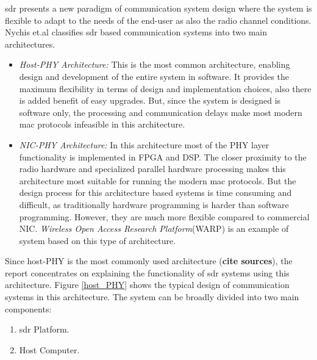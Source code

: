 \ac{sdr} presents a new paradigm of communication system design where the system is flexible to adapt to the needs of the end-user as also the radio channel conditions. Nychis et.al \cite{nychis_enabling_nodate} classifies \ac{sdr} based communication systems into two main architectures.
\begin{itemize} 
\item{\textit{Host-PHY Architecture:} This is the most common architecture, enabling design and development of the entire system in software.
It provides the maximum flexibility in terms of design and implementation choices, also there is added benefit of easy upgrades.
But, since the system is designed is software only, the processing and communication delays make most modern \ac{mac} protocols infeasible in this architecture.}


\item{\textit{NIC-PHY Architecture:} In this architecture most of the \ac{PHY} layer functionality is implemented in \ac{FPGA} and \ac{DSP}.
The closer proximity to the radio hardware and specialized parallel hardware processing makes this architecture most suitable for running the modern \ac{mac} protocols.
But the design process for this architecture based systems is time consuming and difficult, as traditionally hardware programming is harder than software programming.
However, they are much more flexible compared to commercial \ac{NIC}.
\textit{Wireless Open Access Research Platform}(WARP) \cite{noauthor_warp_nodate} is an example of system based on this type of architecture.}

\end{itemize}
Since host-PHY \cite{nychis_enabling_nodate} is the most commonly used architecture (\textbf{cite sources}), the report concentrates on explaining the functionality of \ac{sdr} systems using this architecture.
Figure \ref{host_PHY} shows the typical design of communication systems in this architecture. The system can be broadly divided into two main components:
\begin{enumerate}
\item{\ac{sdr} Platform.}
\item{Host Computer.}
\end{enumerate}

